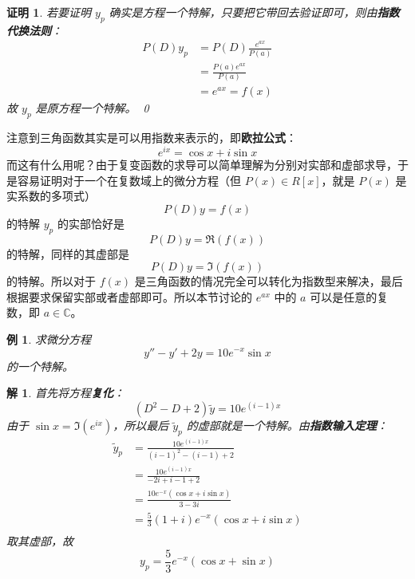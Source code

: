 \documentclass{article}
\newtheorem*{prf}{证明}
\newtheorem{exm}{例}[section]
\newtheorem*{sol}{解}
\begin{document}
\begin{prf}
若要证明 $y_p$ 确实是方程一个特解，只要把它带回去验证即可，则由\textbf{指数代换法则}：
\begin{align*}
    P(D)y_p &= P(D)\frac{e^{ax}}{P(a)}\\
    &= \frac{P(a)e^{ax}}{P(a)}\\
    &= e^{ax} = f(x)
\end{align*}
故 $y_p$ 是原方程一个特解。
    \qed
\end{prf}

\noindent 注意到三角函数其实是可以用指数来表示的，即\textbf{欧拉公式}：
$$
e^{ix} = \cos x + i \sin x
$$
\noindent 而这有什么用呢？由于复变函数的求导可以简单理解为分别对实部和虚部求导，于是容易证明对于一个在复数域上的微分方程（但 $P(x)\in R[x]$，就是 $P(x)$ 是实系数的多项式）
$$
P(D)y = f(x)
$$
的特解 $y_p$ 的实部恰好是
$$
P(D)y = \Re(f(x))
$$
的特解，同样的其虚部是
$$
P(D)y = \Im(f(x))
$$
的特解。所以对于 $f(x)$ 是三角函数的情况完全可以转化为指数型来解决，最后根据要求保留实部或者虚部即可。所以本节讨论的 $e^{ax}$ 中的 $a$ 可以是任意的复数，即 $a \in \mathbb{C}$。

\begin{exm}
求微分方程
$$
y'' - y' + 2y = 10e^{-x}\sin x
$$
的一个特解。
\end{exm}
\begin{sol}
首先将方程\textbf{复化}：
$$
(D^2-D+2)\tilde{y}=10e^{(i-1)x}
$$
由于 $\sin x = \Im(e^{ix})$，所以最后 $\tilde{y}_p$ 的虚部就是一个特解。由\textbf{指数输入定理}：
\begin{align*}
    \tilde{y}_p &= \frac{10e^{(i-1)x}}{(i-1)^2-(i-1)+2}\\
    &= \frac{10e^{(i-1)x}}{-2i+i-1+2}\\
    &= \frac{10e^{-x}(\cos x + i \sin x)}{3 - 3i}\\
    &= \frac{5}{3}(1+i)e^{-x}(\cos x + i \sin x)\\
\end{align*}
取其虚部，故
$$
y_p = \frac{5}{3}e^{-x}(\cos x + \sin x)
$$
\end{sol}
\end{document}
